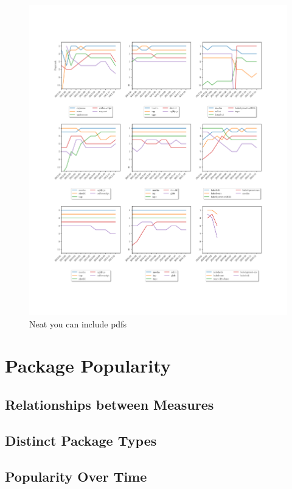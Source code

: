 \documentclass[10pt,conference]{IEEEtran}
\begin{document}
\begin{figure}

  \includegraphics[width=1\textwidth]{figures/highest_ranked_monthly_100.pdf}
  \caption{Neat you can include pdfs}
  \label{ranksByYear}
\end{figure}

\section{Package Popularity}

\subsection{Relationships between Measures}

\subsection{Distinct Package Types}

\subsection{Popularity Over Time}
\end{document}
